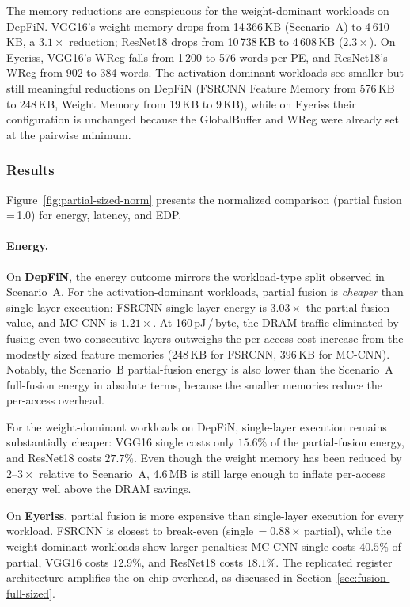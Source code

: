 The memory reductions are conspicuous for the weight-dominant
workloads on DepFiN.
VGG16's weight memory drops from 14\,366\,KB (Scenario~A) to
4\,610\,KB, a $3.1\times$ reduction; ResNet18 drops from
10\,738\,KB to 4\,608\,KB ($2.3\times$).
On Eyeriss, VGG16's WReg falls from 1\,200 to 576 words per PE,
and ResNet18's WReg from 902 to 384 words.
The activation-dominant workloads see smaller but still
meaningful reductions on DepFiN (FSRCNN Feature Memory from 576\,KB to
248\,KB, Weight Memory from 19\,KB to 9\,KB), while on Eyeriss their
configuration is unchanged because the GlobalBuffer and WReg
were already set at the pairwise minimum.

\subsubsection{Results}

Figure~\ref{fig:partial-sized-norm} presents the normalized
comparison (partial fusion\,=\,1.0) for energy, latency, and EDP.

\paragraph{Energy.}
On \textbf{DepFiN}, the energy outcome mirrors the
workload-type split observed in Scenario~A.
For the activation-dominant workloads, partial fusion is
\emph{cheaper} than single-layer execution: FSRCNN single-layer
energy is $3.03\times$ the partial-fusion value, and MC-CNN is
$1.21\times$.
At 160\,pJ\,/\,byte, the DRAM traffic eliminated by fusing even
two consecutive layers outweighs the per-access cost increase from
the modestly sized feature memories (248\,KB for FSRCNN, 396\,KB
for MC-CNN).
Notably, the Scenario~B partial-fusion energy is also lower than
the Scenario~A full-fusion energy in absolute terms, because the smaller
memories reduce the per-access overhead.

For the weight-dominant workloads on DepFiN, single-layer
execution remains substantially cheaper: VGG16 single costs only
$15.6\%$ of the partial-fusion energy, and ResNet18 costs
$27.7\%$.
Even though the weight memory has been reduced by $2$--$3\times$
relative to Scenario~A, 4.6\,MB is still large enough to
inflate per-access energy well above the DRAM savings.

On \textbf{Eyeriss}, partial fusion is more expensive than
single-layer execution for every workload.
FSRCNN is closest to break-even (single\,$= 0.88\times$\,partial),
while the weight-dominant workloads show larger penalties:
MC-CNN single costs $40.5\%$ of partial, VGG16 costs $12.9\%$,
and ResNet18 costs $18.1\%$.
The replicated register architecture amplifies the on-chip
overhead, as discussed in Section~\ref{sec:fusion-full-sized}.

